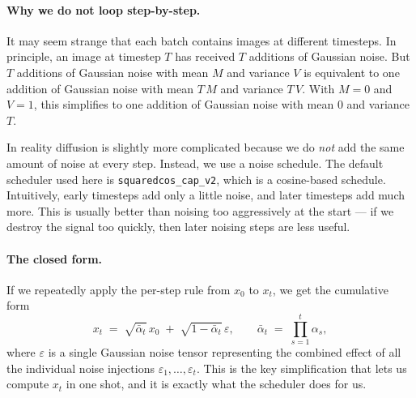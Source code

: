 \documentclass[11pt]{article}
\newcommand{\code}[1]{\texttt{#1}}
\newcommand{\xT}{x_t}
\newcommand{\xZero}{x_0}
\newcommand{\eps}{\varepsilon}
\newcommand{\abar}{\bar{\alpha}}
\begin{document}
\paragraph{Why we do not loop step-by-step.} It may seem strange that each
batch contains images at different timesteps. In principle, an image at
timestep $T$ has received $T$ additions of Gaussian noise. But $T$ additions
of Gaussian noise with mean $M$ and variance $V$ is equivalent to one
addition of Gaussian noise with mean $T\,M$ and variance $T\,V$. With
$M=0$ and $V=1$, this simplifies to one addition of Gaussian noise with
mean $0$ and variance $T$.

In reality diffusion is slightly more complicated because we do \emph{not}
add the same amount of noise at every step. Instead, we use a noise schedule.
The default scheduler used here is \code{squaredcos\_cap\_v2}, which is a
cosine-based schedule. Intuitively, early timesteps add only a little noise,
and later timesteps add much more. This is usually better than noising too
aggressively at the start --- if we destroy the signal too quickly, then
later noising steps are less useful.

\paragraph{The closed form.} If we repeatedly apply the per-step rule from
$\xZero$ to $\xT$, we get the cumulative form
\[
  \xT \;=\; \sqrt{\abar_t}\,\xZero \;+\; \sqrt{1-\abar_t}\,\eps,
  \qquad
  \abar_t \;=\; \prod_{s=1}^{t}\alpha_s,
\]
where $\eps$ is a single Gaussian noise tensor representing the combined
effect of all the individual noise injections $\eps_1,\ldots,\eps_t$. This is
the key simplification that lets us compute $\xT$ in one shot, and it is
exactly what the scheduler does for us.
\end{document}
